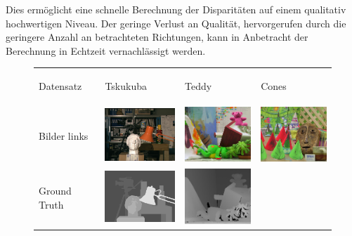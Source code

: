 \noindent
Dies ermöglicht eine schnelle Berechnung der Disparitäten auf einem qualitativ hochwertigen Niveau. Der geringe Verlust an Qualität, hervorgerufen durch die geringere Anzahl an betrachteten Richtungen, kann in Anbetracht der Berechnung in Echtzeit vernachlässigt werden.

\begin{figure}[h]
\centering
	\begin{tabular}{m{2cm} m{3.3cm} m{3.3cm} m{3.3cm}}
	{\scriptsize Datensatz}&
	\begin{center} {\scriptsize Tskukuba} \end{center} &
	\begin{center} {\scriptsize Teddy} \end{center} &
	\begin{center} {\scriptsize Cones} \end{center}
	\\
	{\scriptsize Bilder links} &
	\includegraphics[width=3cm]{img/disparity_images/left_tsukuba.png} & 
	\includegraphics[width=3cm]{img/disparity_images/left_teddy.png} & 
	\includegraphics[width=3cm]{img/disparity_images/left_cones.png} 
	\\ 
	{\scriptsize Ground Truth} &
	\includegraphics[width=3cm]{img/disparity_images/gt_tsukuba.png} & 
	\includegraphics[width=3cm]{img/disparity_images/gt_teddy.png} & 

\end{tabular}
\end{figure}
